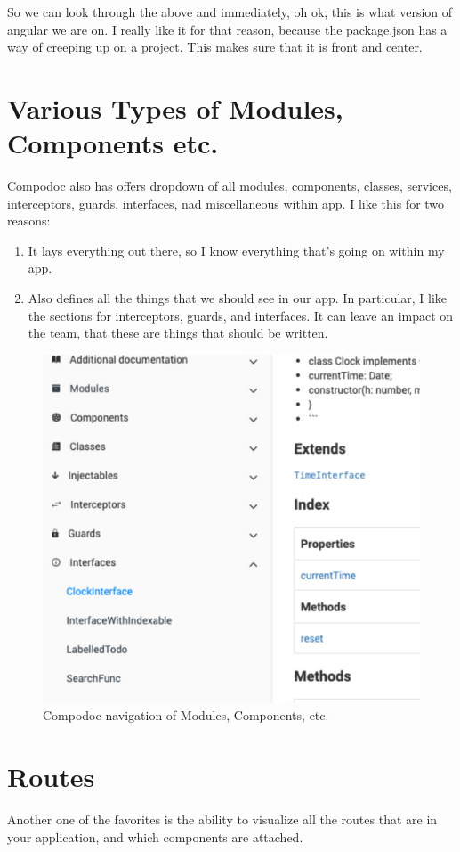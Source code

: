 So we can look through the above and immediately, oh ok, this is what version of angular we are on. I really like it for that reason, because the package.json has a way of creeping up on a project. This makes sure that it is front and center. 

\section{Various Types of Modules, Components etc.}
Compodoc also has offers dropdown of all modules, components, classes, services, interceptors, guards, interfaces, nad miscellaneous within app. I like this for two reasons: 
\begin{enumerate}
  \item It lays everything out there, so I know everything that's going on within my app.
  \item Also defines all the things that we should see in our app. In particular, I like the sections for interceptors, guards, and interfaces. It can leave an impact on the team, that these are things that should be written.
\end{enumerate}

\begin{figure}[h!]
\caption{Compodoc navigation of Modules, Components, etc.}
\includegraphics[width=414pt]{graphics/compodoc/nav/compodoc-nav-screenshot.pdf}
\end{figure}

\section{Routes}
Another one of the favorites is the ability to visualize all the routes that are in your application, and which components are attached. 